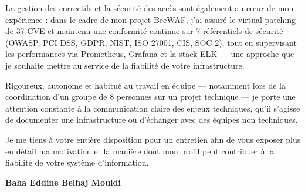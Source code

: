 \documentclass[a4paper,11pt]{article}
\begin{document}
La gestion des correctifs et la sécurité des accès sont également au cœur de mon expérience : dans le cadre de mon projet BeeWAF, j'ai assuré le virtual patching de 37 CVE et maintenu une conformité continue sur 7 référentiels de sécurité (OWASP, PCI DSS, GDPR, NIST, ISO 27001, CIS, SOC 2), tout en supervisant les performances via Prometheus, Grafana et la stack ELK --- une approche que je souhaite mettre au service de la fiabilité de votre infrastructure.

Rigoureux, autonome et habitué au travail en équipe --- notamment lors de la coordination d'un groupe de 8 personnes sur un projet technique --- je porte une attention constante à la communication claire des enjeux techniques, qu'il s'agisse de documenter une infrastructure ou d'échanger avec des équipes non techniques.

Je me tiens à votre entière disposition pour un entretien afin de vous exposer plus en détail ma motivation et la manière dont mon profil peut contribuer à la fiabilité de votre système d'information.

\vspace{0.8cm}

\begin{flushright}
{\bfseries Baha Eddine Belhaj Mouldi}
\end{flushright}
\end{document}
